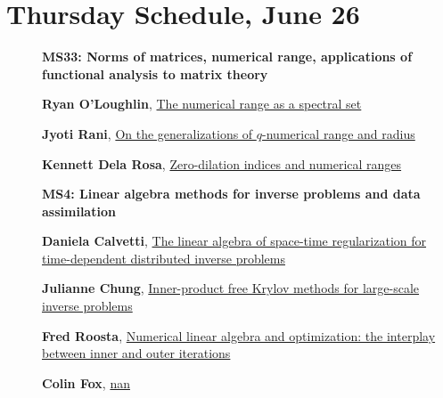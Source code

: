 \documentclass[ILAS2025-program.tex]{subfiles}
\begin{document}
\section*{Thursday Schedule, June 26 }
        
        \begin{description}
    \item[] {\color{mstitle}\textbf{MS33: Norms of matrices, numerical range, applications of functional analysis to matrix theory}} 
    \item[] \hypertarget{up0277}{}\textbf{Ryan O'Loughlin}, \hyperlink{down0277}{The numerical range as a spectral set}
        \item[] \hypertarget{up0278}{}\textbf{Jyoti Rani}, \hyperlink{down0278}{On the generalizations of $q$-numerical range and radius}
        \item[] \hypertarget{up0279}{}\textbf{Kennett Dela Rosa}, \hyperlink{down0279}{Zero-dilation indices and numerical ranges}
        \end{description}
    \begin{description}
    \item[] {\color{mstitle}\textbf{MS4: Linear algebra methods for inverse problems and data assimilation}} 
    \item[] \hypertarget{up0311}{}\textbf{Daniela Calvetti}, \hyperlink{down0311}{The linear algebra of space-time regularization for time-dependent distributed inverse problems}
        \item[] \hypertarget{up0312}{}\textbf{Julianne Chung}, \hyperlink{down0312}{Inner-product free Krylov methods for large-scale inverse problems}
        \item[] \hypertarget{up0313}{}\textbf{Fred Roosta}, \hyperlink{down0313}{Numerical linear algebra and optimization: the interplay between inner and outer iterations
}
        \item[] \hypertarget{up0314}{}\textbf{Colin Fox}, \hyperlink{down0314}{nan}
        \end{description}
\end{document}
